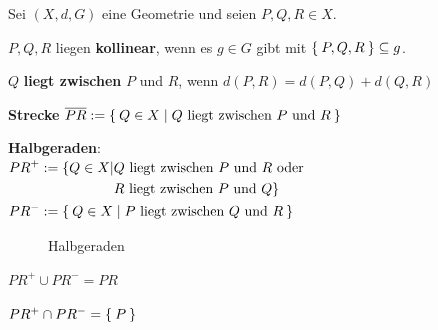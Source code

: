 \begin{definition}
    Sei $(X, d, G)$ eine Geometrie und seien $P, Q, R \in X$.
    \begin{defenum}
        \item $P, Q, R$ liegen \textbf{kollinear}, 
              wenn es $g \in G$ gibt mit $\Set{P, Q, R} \subseteq g$.
        \item $Q$ \textbf{liegt zwischen} $P$
              und $R$, wenn $d(P, R) = d(P, Q) + d(Q, R)$
        \item \textbf{Strecke} $\overline{PR} := \Set{Q \in X | Q \text{ liegt zwischen } P \text{ und } R}$
        \item \textbf{Halbgeraden}:\\
              $\begin{aligned}[t]
                  PR^+ &:= \{Q \in X | Q \text{ liegt zwischen } P \text{ und } R \text{ oder } \\
             &\hphantom{:= \{Q \in X |\;} R \text{ liegt zwischen } P \text{ und } Q\}\\
                  PR^- &:= \Set{Q \in X | P \text{ liegt zwischen } Q \text{ und } R}
              \end{aligned}$
    \end{defenum}
\end{definition}

\begin{figure}[htp]
    \centering
    
    \caption{Halbgeraden}
    \label{fig:halbgeraden}
\end{figure}

\begin{bemerkung}
    \begin{bemenum}
        \item $PR^+ \cup PR^- = PR$
        \item $PR^+ \cap PR^- = \Set{P}$
    \end{bemenum}
\end{bemerkung}

